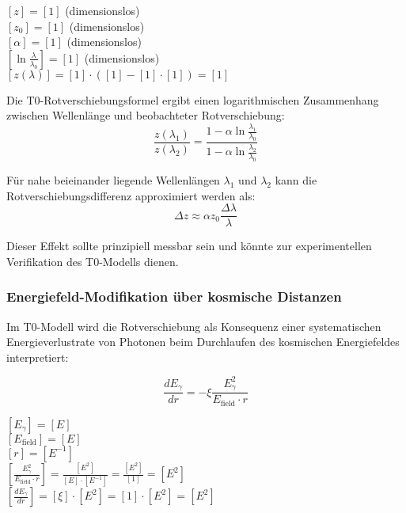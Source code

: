 \documentclass[12pt,a4paper]{article}
\theoremstyle{definition}
\begin{document}
\begin{einheitencheck}
$[z] = [1]$ (dimensionslos)\\
$[z_0] = [1]$ (dimensionslos)\\
$[\alpha] = [1]$ (dimensionslos)\\
$[\ln\frac{\lambda}{\lambda_0}] = [1]$ (dimensionslos)\\
$[z(\lambda)] = [1] \cdot ([1] - [1] \cdot [1]) = [1]$ \checkmark
\end{einheitencheck}

\begin{verhaltnis}
Die T0-Rotverschiebungsformel ergibt einen logarithmischen Zusammenhang zwischen Wellenlänge und beobachteter Rotverschiebung:
\begin{equation}
	\frac{z(\lambda_1)}{z(\lambda_2)} = \frac{1 - \alpha \ln\frac{\lambda_1}{\lambda_0}}{1 - \alpha \ln\frac{\lambda_2}{\lambda_0}}
\end{equation}

Für nahe beieinander liegende Wellenlängen $\lambda_1$ und $\lambda_2$ kann die Rotverschiebungsdifferenz approximiert werden als:
\begin{equation}
	\Delta z \approx \alpha z_0 \frac{\Delta\lambda}{\lambda}
\end{equation}

Dieser Effekt sollte prinzipiell messbar sein und könnte zur experimentellen Verifikation des T0-Modells dienen.
\end{verhaltnis}

\subsubsection{Energiefeld-Modifikation über kosmische Distanzen}

Im T0-Modell wird die Rotverschiebung als Konsequenz einer systematischen Energieverlustrate von Photonen beim Durchlaufen des kosmischen Energiefeldes interpretiert:

\begin{equation}
\boxed{\frac{dE_\gamma}{dr} = -\xi \frac{E_\gamma^2}{E_{\text{field}} \cdot r}}
\end{equation}

\begin{einheitencheck}
$[E_\gamma] = [E]$\\
$[E_{\text{field}}] = [E]$\\
$[r] = [E^{-1}]$\\
$[\frac{E_\gamma^2}{E_{\text{field}} \cdot r}] = \frac{[E^2]}{[E] \cdot [E^{-1}]} = \frac{[E^2]}{[1]} = [E^2]$\\
$[\frac{dE_\gamma}{dr}] = [\xi] \cdot [E^2] = [1] \cdot [E^2] = [E^2]$ \checkmark
\end{einheitencheck}
\end{document}
